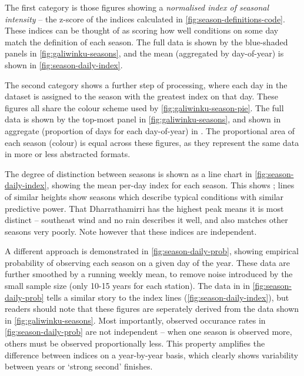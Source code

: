 The first category is those figures showing a \textit{normalised index of
seasonal intensity} -- the z-score of the indices calculated in
\cref{fig:season-definitions-code}.  These indices can be thought of as scoring
how well conditions on some day match the definition of each season.
The full data is shown by the blue-shaded panels in \cref{fig:galiwinku-seasons},
and the mean (aggregated by day-of-year) is shown in \cref{fig:season-daily-index}.

The second category shows a further step of processing, where each day in
the dataset is assigned to the season with the greatest index on that day.
These figures all share the colour scheme used by \cref{fig:galiwinku-season-pie}.
The full data is shown by the top-most panel in \cref{fig:galiwinku-seasons},
and shown in aggregate (proportion of days for each day-of-year) in
.  The proportional area of each season (colour)
is equal across these figures, as they represent the same data in more
or less abstracted formats.

The degree of distinction between seasons is shown as a line chart in
\cref{fig:season-daily-index}, showing the mean per-day index for each
season.  This shows ; lines of similar heights show seasons which describe
typical conditions with similar predictive power.  That Dharrathamirri
has the highest peak means it is most distinct -- southeast wind and no
rain describes it well, and also matches other seasons very poorly.
Note however that these indices are independent.

A different approach is demonstrated in \cref{fig:season-daily-prob}, showing
empirical probability of observing each season on a given day of the year.
These data are further smoothed by a running weekly mean, to remove noise
introduced by the small sample size (only 10-15 years for each station).
%
The data in in \cref{fig:season-daily-prob} tells a similar story to
the index lines (\cref{fig:season-daily-index}), but readers should note
that these figures are seperately derived from the data shown in
\cref{fig:galiwinku-seasons}.  Most importantly, observed occurance
rates in \cref{fig:season-daily-prob} are not independent -- when one season is observed more, others
must be observed proportionally less.  This property amplifies the
difference between indices on a year-by-year basis, which clearly
shows variability between years or `strong second' finishes.



